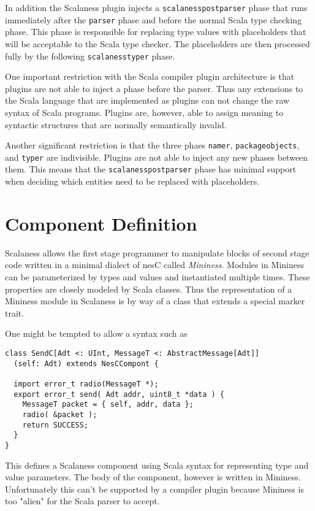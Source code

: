 In addition the Scalaness plugin injects a \texttt{scalanesspostparser} phase that runs
immediately after the \texttt{parser} phase and before the normal Scala type checking phase.
This phase is responsible for replacing type values with placeholders that will be acceptable to
the Scala type checker. The placeholders are then processed fully by the following
\texttt{scalanesstyper} phase.

One important restriction with the Scala compiler plugin architecture is that plugins are not
able to inject a phase before the parser. Thus any extensions to the Scala language that are
implemented as plugins can not change the raw syntax of Scala programs. Plugins are, however,
able to assign meaning to syntactic structures that are normally semantically invalid.

Another significant restriction is that the three phaes \texttt{namer}, \texttt{packageobjects},
and \texttt{typer} are indivisible. Plugins are not able to inject any new phases between them.
This means that the \texttt{scalanesspostparser} phase has minimal support when deciding which
entities need to be replaced with placeholders.


\section{Component Definition}

Scalaness allows the first stage programmer to manipulate blocks of second stage code written in
a minimal dialect of nesC called \textit{Mininess}. Modules in Mininess can be parameterized by
types and values and instantiated multiple times. These properties are closely modeled by Scala
classes. Thus the representation of a Mininess module in Scalaness is by way of a class that
extends a special marker trait.

One might be tempted to allow a syntax such as

\singlespace
\begin{lstlisting}[language=scalaness]
class SendC[Adt <: UInt, MessageT <: AbstractMessage[Adt]]
  (self: Adt) extends NesCCompont {

  import error_t radio(MessageT *);
  export error_t send( Adt addr, uint8_t *data ) {
    MessageT packet = { self, addr, data };
    radio( &packet );
    return SUCCESS;
  }
}
\end{lstlisting}
\primaryspacing

This defines a Scalaness component using Scala syntax for representing type and value
parameters. The body of the component, however is written in Mininess. Unfortunately this can't
be supported by a compiler plugin because Mininess is too "alien" for the Scala parser to
accept.


